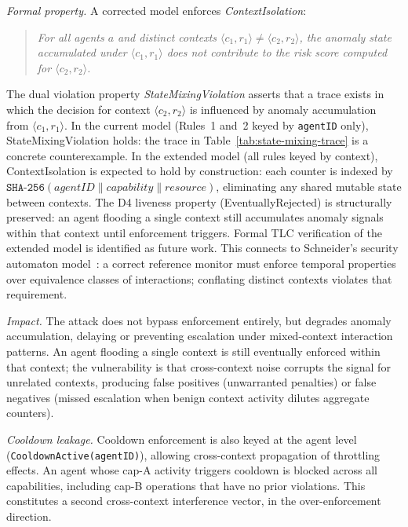\documentclass[11pt]{article}
\theoremstyle{definition}
\begin{document}
\emph{Formal property.}
A corrected model enforces \emph{ContextIsolation}:

\begin{quote}
\textit{For all agents $a$ and distinct contexts $\langle c_1, r_1 \rangle \neq \langle c_2, r_2 \rangle$,
the anomaly state accumulated under $\langle c_1, r_1 \rangle$ does not
contribute to the risk score computed for $\langle c_2, r_2 \rangle$.}
\end{quote}

The dual violation property \emph{StateMixingViolation} asserts that a trace exists
in which the decision for context $\langle c_2, r_2 \rangle$ is influenced by
anomaly accumulation from $\langle c_1, r_1 \rangle$.
In the current model (Rules~1 and~2 keyed by \texttt{agentID} only),
StateMixingViolation holds: the trace in Table~\ref{tab:state-mixing-trace}
is a concrete counterexample.
In the extended model (all rules keyed by context), ContextIsolation
is expected to hold by construction: each counter is indexed by
$\texttt{SHA-256}(\textit{agentID} \parallel \textit{capability} \parallel \textit{resource})$,
eliminating any shared mutable state between contexts.
The D4 liveness property (EventuallyRejected) is structurally preserved:
an agent flooding a single context still accumulates anomaly signals within
that context until enforcement triggers.
Formal TLC verification of the extended model is identified as future work.
This connects to Schneider's security automaton
model~\cite{schneider2000enforceable}: a correct reference monitor must
enforce temporal properties over equivalence classes of interactions;
conflating distinct contexts violates that requirement.

\emph{Impact.}
The attack does not bypass enforcement entirely, but degrades anomaly accumulation,
delaying or preventing escalation under mixed-context interaction patterns.
An agent flooding a single context is still eventually enforced within that context;
the vulnerability is that cross-context noise corrupts the signal for unrelated contexts,
producing false positives (unwarranted penalties) or false negatives
(missed escalation when benign context activity dilutes aggregate counters).

\emph{Cooldown leakage.}
Cooldown enforcement is also keyed at the agent level (\texttt{CooldownActive(agentID)}),
allowing cross-context propagation of throttling effects.
An agent whose cap-A activity triggers cooldown is blocked across all capabilities,
including cap-B operations that have no prior violations.
This constitutes a second cross-context interference vector, in the over-enforcement direction.
\end{document}
